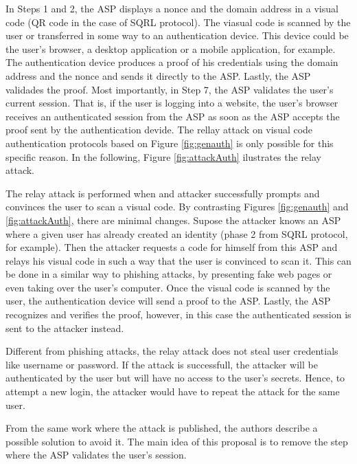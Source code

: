 \documentclass{article}
\begin{document}
	
	
	In Steps 1 and 2, the ASP displays a nonce and the domain address in
	a visual code (QR code in the case of SQRL protocol). The viasual code is
	scanned by the user or transferred in some way to an authentication device.
	This device could be the user's browser, a desktop application or a mobile
	application, for example. The authentication device produces a proof of
	his credentials using the domain address and the nonce and sends it directly
	to the ASP. Lastly, the ASP validades the proof. Most importantly, in Step
	7, the ASP validates the user's current session. That is, if the user is
	logging into a website, the user's browser receives an authenticated session
	from the ASP as soon as the ASP accepts the proof sent by the authentication
	devide. The rellay attack on visual code authentication protocols based on Figure
	\ref{fig:genauth} is only possible for this specific reason. In the following,
	Figure \ref{fig:attackAuth} ilustrates the relay attack.

	

	The relay attack is performed when and attacker successfully prompts and
	convinces the user to scan a visual code. By contrasting Figures \ref{fig:genauth} 
	and \ref{fig:attackAuth}, there are minimal changes. Supose the attacker
	knows an ASP where a given user has already created an identity (phase 2
	from SQRL protocol, for example). Then the attacker requests a code for himself 
	from this ASP and relays his visual code in such a way that the user is 
	convinced to scan it.
	This can be done in a similar way to phishing attacks, by presenting fake web
	pages or even taking over the user's computer. Once the visual code is
	scanned by the user, the authentication device will send a proof to the ASP.
	Lastly, the ASP recognizes and verifies the proof, however, in this case
	the authenticated session is sent to the attacker instead. 

	Different from
	phishing attacks, the relay attack does not steal user credentials like
	username or password. If the attack is successfull, the attacker will be
	authenticated by the user but will have no access to the user's secrets. 
	Hence, to attempt a new login, the attacker would have to repeat the attack
	for the same user.

	From the same work where the attack is published, the authors describe
	a possible solution to avoid it. The main idea of this proposal is to
	remove the step where the ASP validates the user's session.
\end{document}
